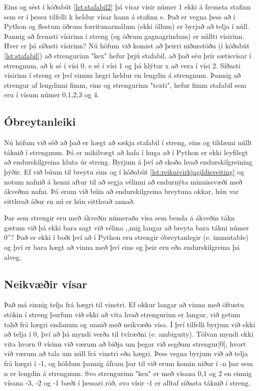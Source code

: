 Eins og sést í kóðabút \ref{lst:stafabil2} þá vísar vísir númer 1 ekki á fremsta stafinn sem er í þessu tilfelli k heldur vísar hann á stafinn e.
Það er vegna þess að í Python og flestum öðrum forritunarmálum (ekki öllum) er byrjað að telja í núll.
Þannig að fremsti vísirinn í streng (og öðrum gagnagrindum) er núllti vísirinn.
Hver er þá síðasti vísirinn?
Nú höfum við komist að þeirri niðurstöðu (í kóðabút \ref{lst:stafabil}) að strengurinn "kex" hefur þrjú stafabil, að það séu þrír sætisvísar í strengnum, að k sé í vísi 0, e sé í vísi 1 og þá hlýtur x að vera í vísi 2.
Síðasti vísirinn í streng er því einum lægri heldur en lengdin á strengnum.
Þannig að strengur af lengdinni fimm, eins og strengurinn "texti", hefur fimm stafabil sem eru í vísum númer 0,1,2,3 og 4.

\subsection{Óbreytanleiki}
Nú höfum við séð að það er hægt að sækja stafabil í streng, eins og tildæmi núllt táknið í strengnum.
Þá er mikilvægt að hafa í huga að í Python er ekki leyfilegt að endurskilgreina hluta úr streng.
Byrjum á því að skoða hvað endurskilgreining þýðir.
Ef við búum til breytu eins og í kóðabút \ref{lst:reiknivirkjagildisveiting} og notum nafnið á henni aftur til að segja vélinni að endurnýta minnissvæði með ákveðnu nafni.
Þá erum við búin að endurskilgreina breytuna okkar, hún var eitthvað áður en nú er hún eitthvað annað.

Þar sem strengir eru með ákveðin númeraða vísa sem benda á ákveðin tákn gætum við þá ekki bara sagt við vélina ,,mig langar að breyta bara tákni númer 0''?
Það er ekki í boði því að í Python eru strengir óbreytanlegir (e. immutable) og því er bara hægt að vinna með því eins og þeir eru eða endurskilgreina þá alveg.

\subsection{Neikvæðir vísar}
Það má einnig telja frá hægri til vinstri.
Ef okkur langar að vinna með öftustu stökin í streng þurfum við ekki að vita hvað strengurinn er langur, við getum talið frá hægri endanum og unnið með neikvæða vísa.
Í því tilfelli byrjum við ekki að telja í 0, því að þá myndi verða til tvíræðni (e. ambiguity).
Tölvan myndi ekki vita hvorn 0 vísinn við værum að biðja um þegar við segðum strengur[0], hvort við værum að tala um núll frá vinstri eða hægri.
Þess vegna byrjum við að telja frá hægri í -1, og höldum þannig áfram þar til við erum komin niður í -n þar sem n er lengdin á strengnum.
Svo strengurinn "kex" er með vísana 0,1 og 2 en einnig vísana -3, -2 og -1 bæði í þessari röð, svo vísir -1 er alltaf síðasta táknið í streng.

